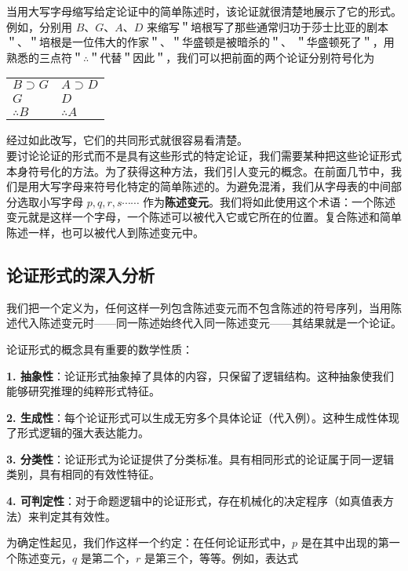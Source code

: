 当用大写字母缩写给定论证中的简单陈述时，该论证就很清楚地展示了它的形式。例如，分别用 $B 、 G 、 A 、 D$ 来缩写＂培根写了那些通常归功于莎士比亚的剧本＂、＂培根是一位伟大的作家＂、＂华盛顿是被暗杀的＂、 ＂华盛顿死了＂，用熟悉的三点符＂$\therefore$＂代替＂因此＂，我们可以把前面的两个论证分别符号化为

\begin{center}
\begin{tabular}{ll}
$B \supset G$ & $A \supset D$ \\
$G$ & $D$ \\
$\therefore B$ & $\therefore A$ \\
\end{tabular}
\end{center}

经过如此改写，它们的共同形式就很容易看清楚。\\
要讨论论证的形式而不是具有这些形式的特定论证，我们需要某种把这些论证形式本身符号化的方法。为了获得这种方法，我们引人变元的概念。在前面几节中，我们是用大写字母来符号化特定的简单陈述的。为避免混淆，我们从字母表的中间部分选取小写字母 $p, q, r, s \cdots \cdots$ 作为\textbf{陈述变元}。我们将如此使用这个术语：一个陈述变元就是这样一个字母，一个陈述可以被代入它或它所在的位置。复合陈述和简单陈述一样，也可以被代人到陈述变元中。

\subsection{论证形式的深入分析}

我们把一个定义为，任何这样一列包含陈述变元而不包含陈述的符号序列，当用陈述代入陈述变元时——同一陈述始终代入同一陈述变元——其结果就是一个论证。

\begin{theorembox}[title=论证形式的数学性质]
论证形式的概念具有重要的数学性质：

\textbf{1. 抽象性}：论证形式抽象掉了具体的内容，只保留了逻辑结构。这种抽象使我们能够研究推理的纯粹形式特征。

\textbf{2. 生成性}：每个论证形式可以生成无穷多个具体论证（代入例）。这种生成性体现了形式逻辑的强大表达能力。

\textbf{3. 分类性}：论证形式为论证提供了分类标准。具有相同形式的论证属于同一逻辑类别，具有相同的有效性特征。

\textbf{4. 可判定性}：对于命题逻辑中的论证形式，存在机械化的决定程序（如真值表方法）来判定其有效性。
\end{theorembox}

为确定性起见，我们作这样一个约定：在任何论证形式中，$p$ 是在其中出现的第一个陈述变元，$q$ 是第二个，$r$ 是第三个，等等。例如，表达式

